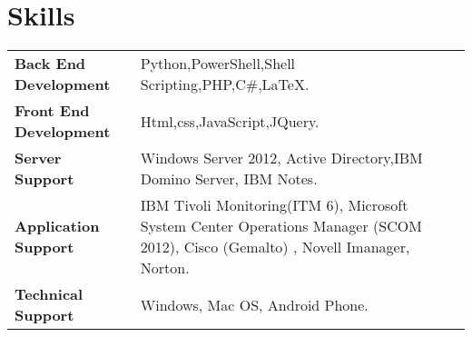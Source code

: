 \documentclass[letterpaper, 12pt]{article}
\begin{document}
\section*{Skills}
\begin{tabular}{m{} m{}} 
	\textbf{Back End Development} & Python,PowerShell,Shell Scripting,PHP,C\#,\LaTeX.  \\ 
	\textbf{Front End Development} & Html,css,JavaScript,JQuery. \\
	\textbf{Server Support} & Windows Server 2012, Active Directory,IBM Domino Server, IBM Notes. \\
	\textbf{Application Support} & IBM Tivoli Monitoring(ITM 6), Microsoft System Center Operations Manager (SCOM 2012), Cisco (Gemalto) , Novell Imanager, Norton. \\ 
	\textbf{Technical Support} & Windows, Mac OS, Android Phone. \\ 
	
\end{tabular}

\end{document}

